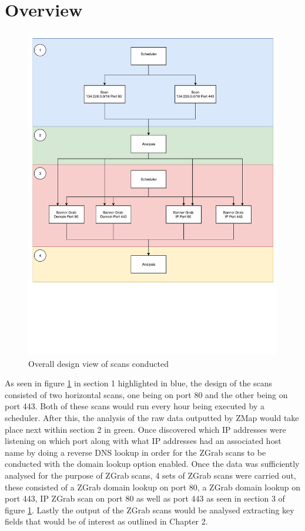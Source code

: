 \documentclass[a4wide,leqno,12pt]{report}
\begin{document}
\section{Overview}
\begin{figure}[H]
\centering
\includegraphics[scale=.5,trim={0 6cm 0 0},clip]{pdf_images/design}
\caption{Overall design view of scans conducted}
\label{fig:design}
\end{figure}

As seen in figure \ref{fig:design} in section 1 highlighted in blue,
the design of the scans consisted of two horizontal scans, one being on port 80 and the other being on port 443. Both of these scans would run every hour being executed by a scheduler. After this, the analysis of the raw data outputted by ZMap would take place next within section 2 in green. Once discovered which IP addresses were listening on which port along with what IP addresses had an associated host name by doing a reverse DNS lookup in order for the ZGrab scans to be conducted with the domain lookup option enabled. Once the data was sufficiently analysed for the purpose of ZGrab scans, 4 sets of ZGrab scans were carried out, these consisted of a ZGrab domain lookup on port 80, a ZGrab domain lookup on port 443, IP ZGrab scan on port 80 as well as port 443 as seen in section 3 of figure \ref{fig:design}. Lastly the output of the ZGrab scans would be analysed extracting key fields that would be of interest as outlined in Chapter 2.
\end{document}
